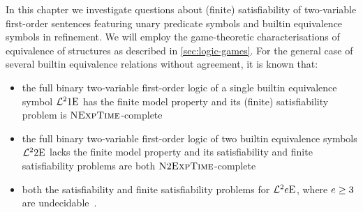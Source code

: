 In this chapter we investigate questions about (finite) satisfiability of
two-variable first-order sentences featuring unary predicate symbols and builtin
equivalence symbols in refinement.
We will employ the game-theoretic characterisations of equivalence of
structures as described in \cref{sec:logic-games}.
For the general case of several builtin equivalence relations without agreement,
it is known that:
\begin{itemize}
  \item the full binary two-variable first-order logic of a single
  builtin equivalence symbol $\mathcal{L}^{2}_{{}}{1}\mathrm{E}_{{}}$ has the finite model
  property and its (finite) satisfiability problem is 
  $\text{\normalfont{\scshape NExpTime}}$-complete~\cite{kieronski2005small} 
  \item the full binary two-variable first-order logic of two
  builtin equivalence symbols $\mathcal{L}^{2}_{{}}{2}\mathrm{E}_{{}}$ lacks the finite model
  property and its satisfiability and finite satisfiability problems are both
  $\text{\normalfont{\scshape N}}2\text{\normalfont{\scshape ExpTime}}$-complete~\cite{kieronski2014two}
  \item both the satisfiability and finite satisfiability problems for
  $\mathcal{L}^{2}_{{}}{e}\mathrm{E}_{{}}$, where $e \geq 3$ are
  undecidable~\cite{kieronski2005small}.
\end{itemize}